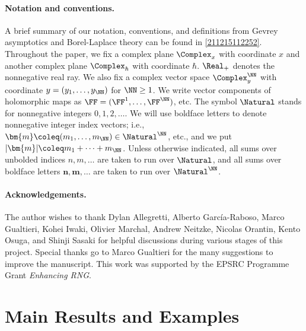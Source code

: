 \documentclass[11pt]{article}
\renewcommand{\mm}{{\bm{m}}}
\renewcommand{\nn}{{\bm{n}}}
\begin{document}
\paragraph{Notation and conventions.}
\label{211214170249}
A brief summary of our notation, conventions, and definitions from Gevrey asymptotics and Borel-Laplace theory can be found in \autoref{211215112252}.
Throughout the paper, we fix a complex plane $\Complex_x$ with coordinate $x$ and another complex plane $\Complex_\hbar$ with coordinate $\hbar$.
$\Real_+$ denotes the nonnegative real ray.
We also fix a complex vector space $\Complex^\NN_y$ with coordinate $y = (y_1, \ldots, y_\NN)$ for $\NN \geq 1$.
We write vector components of holomorphic maps as $\FF = (\FF^1, \ldots, \FF^\NN)$, etc.
The symbol $\Natural$ stands for nonnegative integers $0, 1, 2, \ldots$.
We will use boldface letters to denote nonnegative integer index vectors; i.e., $\mm \coleq (m_1, \ldots, m_\NN) \in \Natural^\NN$, etc., and we put $|\mm| \coleq m_1 + \cdots + m_\NN$.
Unless otherwise indicated, all sums over unbolded indices $n, m, \ldots$ are taken to run over $\Natural$, and all sums over boldface letters $\nn, \mm, \ldots$ are taken to run over $\Natural^\NN$.

\enlargethispage{15pt}

\paragraph*{Acknowledgements.}
The author wishes to thank Dylan Allegretti, Alberto García-Raboso, Marco Gualtieri, Kohei Iwaki, Olivier Marchal, Andrew Neitzke, Nicolas Orantin, Kento Osuga, and Shinji Sasaki for helpful discussions during various stages of this project.
Special thanks go to Marco Gualtieri for the many suggestions to improve the manuscript.
This work was supported by the EPSRC Programme Grant \textit{Enhancing RNG}.



\newpage

\section{Main Results and Examples}
\label{220222154343}
\end{document}
